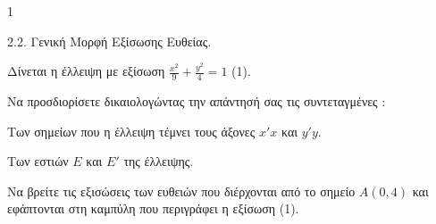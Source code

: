 \begin{ylh}{1}
    \item 2.2. Γενική Μορφή Εξίσωσης Ευθείας.
\end{ylh}
Δίνεται η έλλειψη με εξίσωση $\frac{x^2}{9} + \frac{y^2}{4} = 1$ (1).

\begin{alist}
\item Να προσδιορίσετε δικαιολογώντας την απάντησή σας τις συντεταγμένες :
    \begin{rlist}
    \item Των σημείων που η έλλειψη τέμνει τους άξονες $x'x$ και $y'y$.
    \item Των εστιών $E$ και $E'$ της έλλειψης.
    \end{rlist}
\item Να βρείτε τις εξισώσεις των ευθειών που διέρχονται από το σημείο $A(0 , 4)$ και εφάπτονται στη καμπύλη που περιγράφει η εξίσωση (1).
\end{alist}